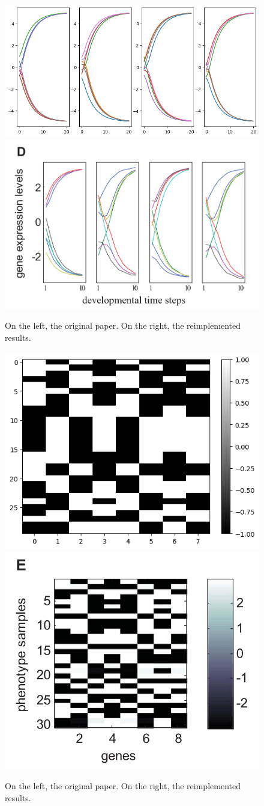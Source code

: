 \documentclass[twocolumn,a4paper]{article}
\begin{document}
    \begin{figure}[h]
        \centering
        \includegraphics[width=0.9\linewidth]{img/fig2d.png}
        \includegraphics[width=0.9\linewidth]{orig_img/fig2d.png}
        \caption{On the left, the original paper. On the right, the reimplemented results.}
    \end{figure}

    \begin{figure}[h]
        \centering
        \includegraphics[width=0.45\linewidth]{img/fig2e.png}
        \includegraphics[width=0.45\linewidth]{orig_img/fig2e.png}
        \caption{On the left, the original paper. On the right, the reimplemented results.}
    \end{figure}
\end{document}

